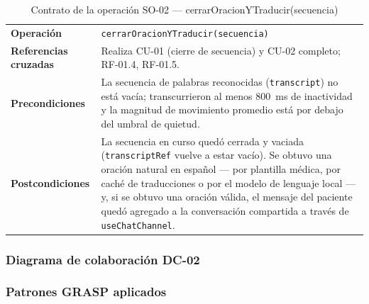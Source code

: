 \begin{table}[H]
\centering
\begin{tabularx}{\textwidth}{@{}p{4.4cm} X@{}}
\toprule
\textbf{Operación} & \texttt{cerrarOracionYTraducir(secuencia)} \\
\textbf{Referencias cruzadas} & Realiza CU-01 (cierre de secuencia) y CU-02
completo; RF-01.4, RF-01.5. \\
\textbf{Precondiciones} & La secuencia de palabras reconocidas
(\texttt{transcript}) no está vacía; transcurrieron al menos 800~ms de
inactividad y la magnitud de movimiento promedio está por debajo del umbral
de quietud. \\
\textbf{Postcondiciones} & La secuencia en curso quedó cerrada y vaciada
(\texttt{transcriptRef} vuelve a estar vacío). Se obtuvo una oración natural
en español --- por plantilla médica, por caché de traducciones o por el
modelo de lenguaje local --- y, si se obtuvo una oración válida, el mensaje
del paciente quedó agregado a la conversación compartida a través de
\texttt{useChatChannel}. \\
\bottomrule
\end{tabularx}
\caption{Contrato de la operación SO-02 --- cerrarOracionYTraducir(secuencia)}
\label{tab:col-contrato-so02}
\end{table}

\subsubsection{Diagrama de colaboración DC-02}


\subsubsection{Patrones GRASP aplicados}

